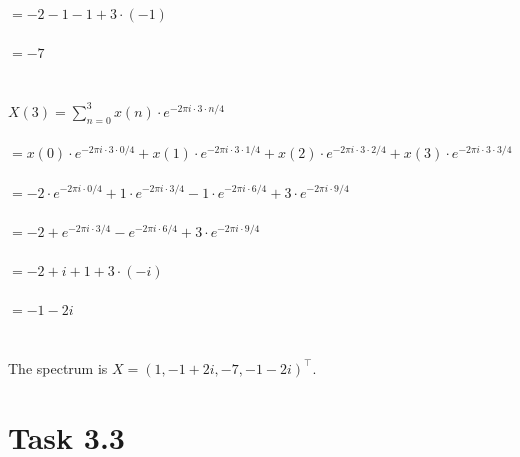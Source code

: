 \documentclass[12pt]{article}
\begin{document}
$= -2 - 1 - 1 + 3 \cdot (-1)$\\\\
$= -7$\\\\\\
$X(3) = \sum_{n=0}^{3} x(n) \cdot e^{-2\pi i \cdot 3 \cdot n/4}$\\\\
$= x(0) \cdot e^{-2\pi i \cdot 3 \cdot 0/4} + x(1) \cdot e^{-2\pi i \cdot 3 \cdot 1/4} + x(2) \cdot e^{-2\pi i \cdot 3 \cdot 2/4} + x(3) \cdot e^{-2\pi i \cdot 3 \cdot 3/4}$\\\\
$= -2 \cdot e^{-2\pi i \cdot 0/4} + 1 \cdot e^{-2\pi i \cdot 3/4} - 1 \cdot e^{-2\pi i \cdot 6/4} + 3 \cdot e^{-2\pi i \cdot 9/4}$\\\\
$= -2 + e^{-2\pi i \cdot 3/4} - e^{-2\pi i \cdot 6/4} + 3 \cdot e^{-2\pi i \cdot 9/4}$\\\\
$= -2 + i + 1 + 3 \cdot (-i)$\\\\
$= -1 - 2i$\\\\\\
The spectrum is $X=(1, -1+2i, -7, -1-2i)^\top$.
 \section*{Task 3.3}
\end{document}
